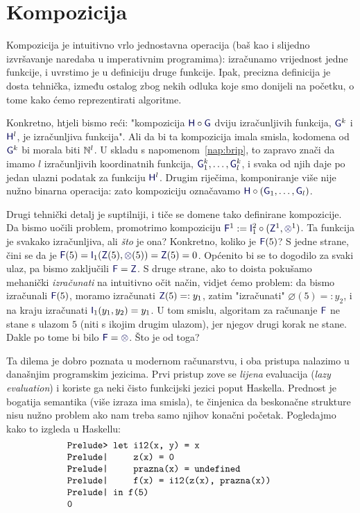 \section{Kompozicija}

Kompozicija je intuitivno vrlo jednostavna operacija (baš kao i slijedno izvršavanje naredaba u imperativnim programima): izračunamo vrijednost jedne funkcije, i uvrstimo je u definiciju druge funkcije. Ipak, precizna definicija je dosta tehnička, između ostalog zbog nekih odluka koje smo donijeli na početku, o tome kako ćemo reprezentirati algoritme.

Konkretno, htjeli bismo reći: "kompozicija $\f H\circ\f G$ dviju izračunljivih funkcija, $\f G^k$ i $\f H^l$, je izračunljiva funkcija". Ali da bi ta kompozicija imala smisla, kodomena od $\f G^k$ bi morala biti ${\mathbb N}^l$. U skladu s napomenom~\ref{nap:brip}, to zapravo znači da imamo $l$ izračunljivih koordinatnih funkcija, $\f G_1^k,\dotsc,\f G_l^k$, i svaka od njih daje po jedan ulazni podatak za funkciju $\f H^l$. Drugim riječima, komponiranje više nije nužno binarna operacija: zato kompoziciju označavamo $\f H\circ(\f G_1,\dotsc,\f G_l)$.

Drugi tehnički detalj je suptilniji, i tiče se domene tako definirane kompozicije. Da bismo uočili problem, promotrimo kompoziciju $\f F^1:=\f I_1^2\circ(\f Z^1,\varnothing^1)$. Ta funkcija je svakako izračunljiva, ali \emph{što} je ona? Konkretno, koliko je $\f F(5)$? S jedne strane, čini se da je $\f F(5)=\f I_1(\f Z(5),\varnothing(5))=\f Z(5)=0$. Općenito bi se to dogodilo za svaki ulaz, pa bismo zaključili $\f F =\f Z$. S druge strane, ako to doista pokušamo mehanički \emph{izračunati} na intuitivno očit način, vidjet ćemo problem: da bismo izračunali $\f F(5)$, moramo izračunati $\f Z(5)=:y_1$, zatim "izračunati" $\varnothing(5)=:y_2$, i na kraju izračunati $\f I_1(y_1,y_2)=y_1$. U tom smislu, algoritam za računanje $\f F$ ne stane s ulazom $5$ (niti s ikojim drugim ulazom), jer njegov drugi korak ne stane. Dakle po tome bi bilo $\f F=\varnothing$. Što je od toga?


Ta dilema je dobro poznata u modernom računarstvu, i oba pristupa nalazimo u današnjim programskim jezicima. Prvi pristup zove se \emph{lijena} evaluacija (\emph{lazy evaluation}) i koriste ga neki čisto funkcijski jezici poput Haskella. Prednost je bogatija semantika (više izraza ima smisla), te činjenica da beskonačne strukture nisu nužno problem ako nam treba samo njihov konačni početak. Pogledajmo kako to izgleda u Haskellu:
\begin{equation}\begin{minipage}{0.8\textwidth}
\begin{verbatim}
    Prelude> let i12(x, y) = x
    Prelude|     z(x) = 0
    Prelude|     prazna(x) = undefined
    Prelude|     f(x) = i12(z(x), prazna(x))
    Prelude| in f(5)
    0
\end{verbatim}
\end{minipage}\end{equation}

